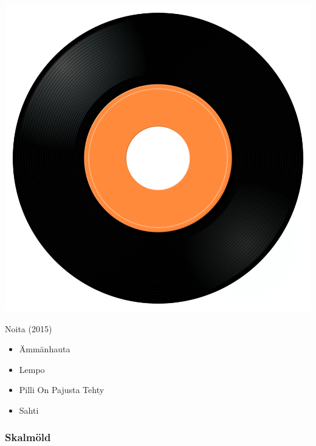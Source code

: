 \begin{minipage}[t]{0.25\textwidth}
\captionsetup{type=figure}
\includegraphics[width=\textwidth]{Images/cover.png}
\caption*{Noita (2015)}
\end{minipage}
\begin{minipage}[t]{0.25\textwidth}\vspace{0pt}
\begin{itemize}[nosep,leftmargin=1em,labelwidth=*,align=left]
	\setlength{\itemsep}{0pt}
	\item Ämmänhauta
	\item Lempo
	\item Pilli On Pajusta Tehty
	\item Sahti
\end{itemize}
\end{minipage}

\subsubsection{Skalmöld}

